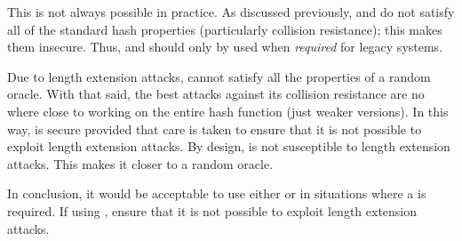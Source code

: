 This is not always possible in practice.
As discussed previously, \MDFive{} and \ShaOne{} do not satisfy
all of the standard hash properties (particularly collision resistance);
this makes them insecure.
Thus, \MDFive{} and \ShaOne{} should only by used
when \emph{required} for legacy systems.

Due to length extension attacks, \ShaTwo{} cannot satisfy
all the properties of a \gls{random oracle}.
With that said, the best attacks against its collision resistance
are no where close to working on the entire \gls{hash function}
(just weaker versions).
In this way, \ShaTwo{} is secure provided that care is taken
to ensure that it is not possible to exploit length extension attacks.
By design, \ShaThree{} is not susceptible to length extension attacks.
This makes it closer to a \gls{random oracle}.

In conclusion, it would be acceptable to use either \ShaTwo{} or \ShaThree{}
in situations where a  is required.
If using \ShaTwo{}, ensure that it is not possible
to exploit length extension attacks.
